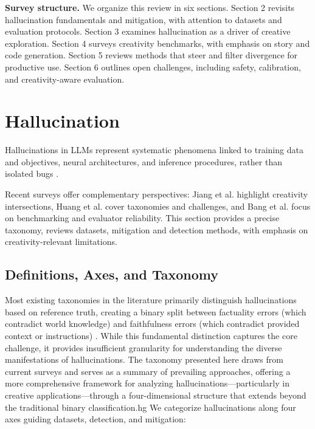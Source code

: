 \documentclass{llncs}
\begin{document}
\textbf{Survey structure.} We organize this review in six sections. Section 2 revisits hallucination fundamentals and mitigation, with attention to datasets and evaluation protocols. Section 3 examines hallucination as a driver of creative exploration. Section 4 surveys creativity benchmarks, with emphasis on story and code generation. Section 5 reviews methods that steer and filter divergence for productive use. Section 6 outlines open challenges, including safety, calibration, and creativity-aware evaluation.


\section{Hallucination}

Hallucinations in LLMs represent systematic phenomena linked to training data and objectives, neural architectures, and inference procedures, rather than isolated bugs \cite{ji2023hallucination,huang2025survey,zhang2023siren,kalai2025why}.

Recent surveys offer complementary perspectives: Jiang et al. \cite{jiang2024survey} highlight creativity intersections, Huang et al. \cite{huang2025survey} cover taxonomies and challenges, and Bang et al. \cite{bang2025hallulens} focus on benchmarking and evaluator reliability. This section provides a precise taxonomy, reviews datasets, mitigation and detection methods, with emphasis on creativity-relevant limitations.

\subsection{Definitions, Axes, and Taxonomy}
Most existing taxonomies in the literature primarily distinguish hallucinations based on reference truth, creating a binary split between factuality errors (which contradict world knowledge) and faithfulness errors (which contradict provided context or instructions) \cite{ji2023hallucination,huang2025survey}. While this fundamental distinction captures the core challenge, it provides insufficient granularity for understanding the diverse manifestations of hallucinations.
The taxonomy presented here draws from current surveys \cite{ji2023hallucination,huang2025survey,bai2025hallucination,zhang2023siren,bang2025hallulens} and serves as a summary of prevailing approaches, offering a more comprehensive framework for analyzing hallucinations—particularly in creative applications—through a four-dimensional structure that extends beyond the traditional binary classification.hg
We categorize hallucinations along four axes guiding datasets, detection, and mitigation:
\end{document}

